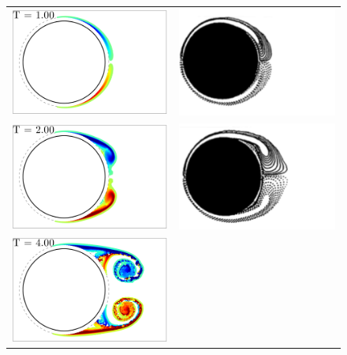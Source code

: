 \begin{figure}
 \begin{center}
 \begin{tabular}{cc}
 \includegraphics[width=6cm]{./Figures/results/static/vortices_T1_00.pdf}  &
 \includegraphics[width=6cm]{./Figures/results/static/KOU_Re1000_T1.png}  \\
 \includegraphics[width=6cm]{./Figures/results/static/vortices_T2_00.pdf}  &
 \includegraphics[width=6cm]{./Figures/results/static/KOU_Re1000_T2.png}  \\
 \includegraphics[width=6cm]{./Figures/results/static/vortices_T4_00.pdf}  &

\end{tabular}
\end{center}
\end{figure}
